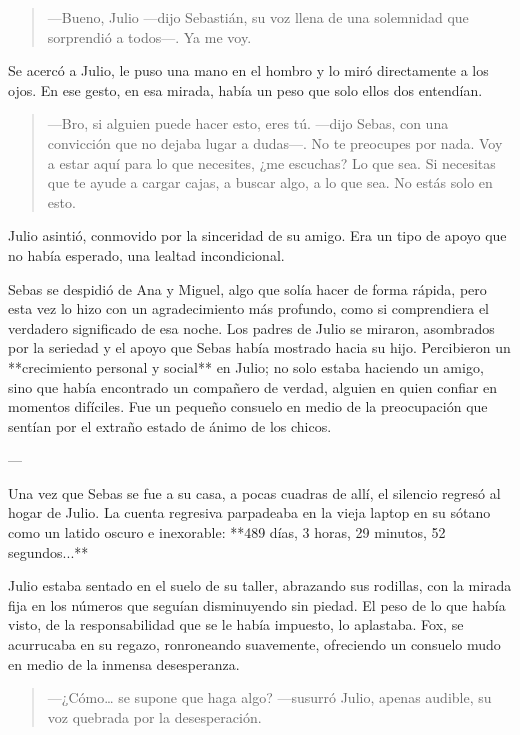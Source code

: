 \documentclass[a4paper,12pt]{book}
\begin{document}
\begin{quote}
    —Bueno, Julio —dijo Sebastián, su voz llena de una solemnidad que sorprendió a todos—. Ya me voy.
\end{quote}

Se acercó a Julio, le puso una mano en el hombro y lo miró directamente a los ojos. En ese gesto, en esa mirada, había un peso que solo ellos dos entendían.

\begin{quote}
    —Bro, si alguien puede hacer esto, eres tú. —dijo Sebas, con una convicción que no dejaba lugar a dudas—. No te preocupes por nada. Voy a estar aquí para lo que necesites, ¿me escuchas? Lo que sea. Si necesitas que te ayude a cargar cajas, a buscar algo, a lo que sea. No estás solo en esto.
\end{quote}

Julio asintió, conmovido por la sinceridad de su amigo. Era un tipo de apoyo que no había esperado, una lealtad incondicional.

Sebas se despidió de Ana y Miguel, algo que solía hacer de forma rápida, pero esta vez lo hizo con un agradecimiento más profundo, como si comprendiera el verdadero significado de esa noche. Los padres de Julio se miraron, asombrados por la seriedad y el apoyo que Sebas había mostrado hacia su hijo. Percibieron un **crecimiento personal y social** en Julio; no solo estaba haciendo un amigo, sino que había encontrado un compañero de verdad, alguien en quien confiar en momentos difíciles. Fue un pequeño consuelo en medio de la preocupación que sentían por el extraño estado de ánimo de los chicos.

---

Una vez que Sebas se fue a su casa, a pocas cuadras de allí, el silencio regresó al hogar de Julio. La cuenta regresiva parpadeaba en la vieja laptop en su sótano como un latido oscuro e inexorable: **489 días, 3 horas, 29 minutos, 52 segundos...**

Julio estaba sentado en el suelo de su taller, abrazando sus rodillas, con la mirada fija en los números que seguían disminuyendo sin piedad. El peso de lo que había visto, de la responsabilidad que se le había impuesto, lo aplastaba. Fox, se acurrucaba en su regazo, ronroneando suavemente, ofreciendo un consuelo mudo en medio de la inmensa desesperanza.

\begin{quote}
    —¿Cómo… se supone que haga algo? —susurró Julio, apenas audible, su voz quebrada por la desesperación.
\end{quote}
\end{document}
